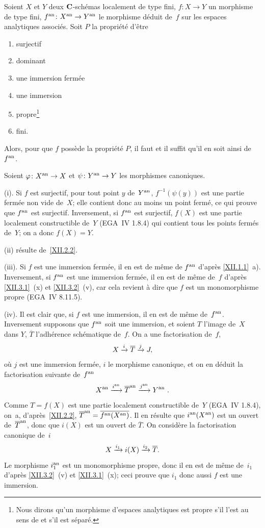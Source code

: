 \begin{proposition}
\label{XII.3.2}
Soient $X$ et $Y$ deux $\mathbf{C}$-sch\'emas localement de type fini,
$f\colon X \to Y$ un morphisme de type fini, $f^\an \colon X^\an \to
Y^\an $ le morphisme d\'eduit de~$f$ sur les espaces analytiques
associ\'es. Soit $P$ la propri\'et\'e d'\^etre
\begin{enumerate}
\item[(i)] surjectif
\item[(ii)] dominant
\item[(iii)] une immersion ferm\'ee
\item[(iv)] une immersion
\item[(v)] propre\footnote{Nous dirons qu'un morphisme d'espaces
analytiques est propre s'il l'est au sens de \cite[ch.\, 1 \S 10 ]{XII.1} et
s'il est s\'epar\'e.}
\item[(vi)]
fini.
\end{enumerate}
Alors, pour que $f$ poss\`ede la propri\'et\'e $P$, il faut et
il suffit qu'il en soit ainsi de~$f^{\mathrm{an}}$.
\end{proposition}

Soient $\varphi \colon X^\an \to X$ et $\psi \colon Y^\an \to Y$ les
morphismes canoniques.

(i). Si $f$ est surjectif, pour tout point $y$ de~$Y^{\mathrm{an}}$, $f^{-1}
(\psi (y)) $ est une partie ferm\'ee non vide de~$X$; elle contient
donc au moins un point ferm\'e, ce qui prouve que $f^{\mathrm{an}}$ est
surjectif. Inversement, si $f^{\mathrm{an}}$ est surjectif, $f(X)$ est une
partie localement constructible de~$Y$ (EGA~IV 1.8.4) qui contient
tous les points ferm\'es de~$Y$; on a donc $f(X)=Y$.

(ii) r\'esulte de~\ref{XII.2.2}.

(iii). Si $f$ est une immersion ferm\'ee, il en est de m\^eme de
$f^{\mathrm{an}}$ d'apr\`es \ref{XII.1.1}~a). Inversement, si $f^{\mathrm{an}}$ est une
immersion ferm\'ee, il en est de m\^eme de~$f$ d'apr\`es
\ref{XII.3.1}~(x) et \ref{XII.3.2}~(v), car cela revient \`a dire
que $f$ est un monomorphisme propre (EGA~IV 8.11.5).

(iv). Il est clair que, si $f$ est une immersion, il en est de
m\^eme de~$f^{\mathrm{an}}$. Inversement supposons que $f^{\mathrm{an}}$ soit une
immersion, et soient $T$ l'image de~$X$ dans $Y$, $\overline{T}$
l'adh\'erence sch\'ematique de~$f$. On a une factorisation de~$f$,
$$
X \xrightarrow{i} \overline{T} \xrightarrow{j} J ,
$$
o\`u $j$ est une immersion ferm\'ee, $i$ le morphisme canonique,
et on en d\'eduit la factorisation suivante de~$f^{\mathrm{an}}$
$$
X^{\mathrm{an}} \xrightarrow{i^{\mathrm{an}}} \overline{T}^{ \mathrm{an}} \xrightarrow{j^{\mathrm{an}}} Y^{\mathrm{an}} \
.
$$
Comme
$T = f(X)$ est une partie localement constructible de~$Y$ (EGA~IV
1.8.4), on~a, d'apr\`es~\ref{XII.2.2}, $\overline{T}^{ \mathrm{an}} =
\overline{f^{\mathrm{an}} (X^{\mathrm{an}} )}$. Il en r\'esulte que $i^{\mathrm{an}} (X^{\mathrm{an}} )$ est
un ouvert de~$\overline{T}^{ \mathrm{an}}$, donc que $i(X) $ est un ouvert de
$\overline{T}$. On consid\`ere la factorisation canonique de~$i$
$$
X \xrightarrow{i_1} i (X) \xrightarrow{i_2} \overline{T}.
$$
Le morphisme $i_1^{\mathrm{an}} $ est un monomorphisme propre, donc il en est de
m\^eme de~$i_1$ d'apr\`es \ref{XII.3.2}~(v) et \ref{XII.3.1}~(x);
ceci prouve que $i_1$ donc aussi $f$ est une immersion.

